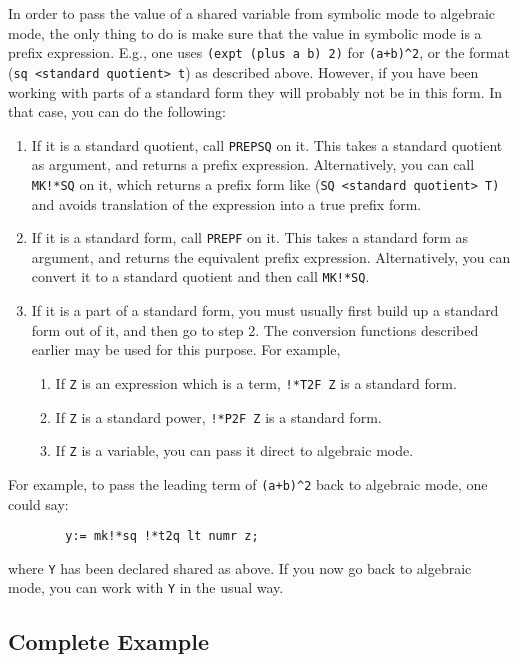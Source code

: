 \documentclass[11pt,letterpaper]{book}
\begin{document}
In order to pass the value of a shared variable from symbolic mode to
algebraic mode, the only thing to do is make sure that the value in
symbolic mode is a prefix expression. E.g., one uses
{\tt (expt (plus a b) 2)} for {\tt (a+b)\verb|^|2}, or the format ({\tt *sq
<standard quotient> t}) as described above.  However, if you have
been working with parts of a standard form they will probably not be in
this form.  In that case, you can do the following:
\begin{enumerate}
\item If it is a standard quotient, call {\tt PREPSQ} on it.  This takes a
standard quotient as argument, and returns a prefix expression.
Alternatively, you can call {\tt MK!*SQ} on it, which returns a prefix
form like ({\tt *SQ <standard quotient> T)} and avoids translation of
the expression into a true prefix form.

\item If it is a standard form, call {\tt PREPF} on it.  This takes a
standard form as argument, and returns the equivalent prefix expression.
Alternatively, you can convert it to a standard quotient and then call
{\tt MK!*SQ}.

\item If it is a part of a standard form, you must usually first build up a
standard form out of it, and then go to step 2. The conversion functions
described earlier may be used for this purpose. For example,
\begin{enumerate}
\item If {\tt Z} is an expression which is a term, {\tt !*T2F Z} is a
standard form.
\item If {\tt Z} is a standard power, {\tt !*P2F Z} is a standard form.
\item If {\tt Z} is a variable, you can pass it direct to algebraic mode.
\end{enumerate}
\end{enumerate}
For example, to pass the leading term of {\tt (a+b)\verb|^|2} back to
algebraic mode, one could say:
{\small\begin{verbatim}
        y:= mk!*sq !*t2q lt numr z;
\end{verbatim}}
where {\tt Y} has been declared shared as above.  If you now go back to
algebraic mode, you can work with {\tt Y} in the usual way.


\subsection{Complete Example}
\end{document}
